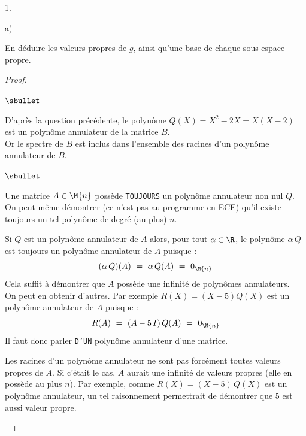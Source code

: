 \begin{noliste}{1.}
\begin{noliste}{a)}
    
    \item En déduire les valeurs propres de $g$, ainsi qu'une base de 
    chaque sous-espace propre.
    
    \begin{proof}~
      \begin{noliste}{$\sbullet$}
	\item D'après la question précédente, le polynôme $Q(X) = 
	X^2-2X = X(X-2)$ est un polynôme annulateur de la matrice $B$.\\
	Or le spectre de $B$ est inclus dans l'ensemble des racines d'un
	polynôme annulateur de $B$.
	
	\begin{remark}
	  \begin{noliste}{$\sbullet$}
	    \item Une matrice $A\in \M{n}$ possède {\tt TOUJOURS} un 
	    polynôme annulateur non nul $Q$.\\
	    On peut même démontrer (ce n'est pas au programme en ECE)
	    qu'il existe toujours un tel polynôme de degré (au plus) 
	    $n$.
	    
	    \item Si $Q$ est un polynôme annulateur de $A$ alors, pour 
	    tout $\alpha \in \R$, le polynôme $\alpha \, Q$ est 
	    toujours un polynôme annulateur de $A$ puisque :
	    \[
	      (\alpha \, Q)(A) \ = \ \alpha \, Q(A) \ = \
	      0_{\M{n}}
	    \]
	    Cela suffit à démontrer que $A$ possède une infinité de 
	    polynômes annulateurs.\\
	    On peut en obtenir d'autres. Par exemple $R(X) = (X-5)Q(X)$
	    est un polynôme annulateur de $A$ puisque :
	    \[
	      R(A) \ = \ (A-5 \, I) \, Q(A) \ = \ 0_{\M{n}}
	    \]
	    Il faut donc parler {\tt D'UN} polynôme annulateur d'une 
	    matrice.
	    
	    \item Les racines d'un polynôme annulateur ne sont pas 
	    forcément toutes valeurs propres de $A$. Si c'était le cas,
	    $A$ aurait une infinité de valeurs propres (elle en 
	    possède au plus $n$). Par exemple, comme $R(X) =
	    (X-5) \, Q(X)$ est un polynôme annulateur, un tel 
	    raisonnement permettrait de démontrer que $5$ est aussi
	    valeur propre.
	  \end{noliste}
	\end{remark}
	

\end{noliste}
\end{proof}
\end{noliste}
\end{noliste}
